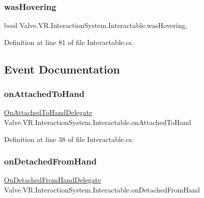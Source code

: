 \subsubsection{\texorpdfstring{wasHovering}{wasHovering}}
{\footnotesize\ttfamily bool Valve.\+V\+R.\+Interaction\+System.\+Interactable.\+was\+Hovering\hspace{0.3cm}{\ttfamily [get]}, {}}



Definition at line 81 of file Interactable.\+cs.



\subsection{Event Documentation}
\mbox{\label{class_valve_1_1_v_r_1_1_interaction_system_1_1_interactable_a93c512ea325e910f4810fe4fb126f2c0}} 
\subsubsection{\texorpdfstring{onAttachedToHand}{onAttachedToHand}}
{\footnotesize\ttfamily \mbox{\hyperlink{class_valve_1_1_v_r_1_1_interaction_system_1_1_interactable_a3ec0150eb5701a6782f6dc07c9ddd1a0}{On\+Attached\+To\+Hand\+Delegate}} Valve.\+V\+R.\+Interaction\+System.\+Interactable.\+on\+Attached\+To\+Hand}



Definition at line 38 of file Interactable.\+cs.

\mbox{\label{class_valve_1_1_v_r_1_1_interaction_system_1_1_interactable_a3c06e1a11432b5aa3046bb336a1e40f4}} 
\subsubsection{\texorpdfstring{onDetachedFromHand}{onDetachedFromHand}}
{\footnotesize\ttfamily \mbox{\hyperlink{class_valve_1_1_v_r_1_1_interaction_system_1_1_interactable_abbbcb1950b93f7b9fcbbddc464b88d93}{On\+Detached\+From\+Hand\+Delegate}} Valve.\+V\+R.\+Interaction\+System.\+Interactable.\+on\+Detached\+From\+Hand}



